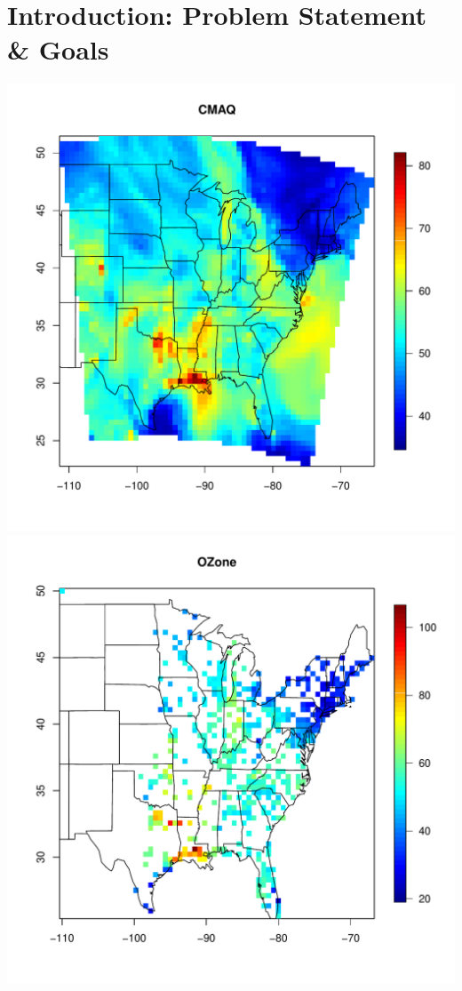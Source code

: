 \documentclass{article}                                                   %
\begin{document}
\section{Introduction: Problem Statement \& Goals}
    \includegraphics{raw/cmaq.pdf}
    \includegraphics{raw/ozone.pdf}
\end{document}
